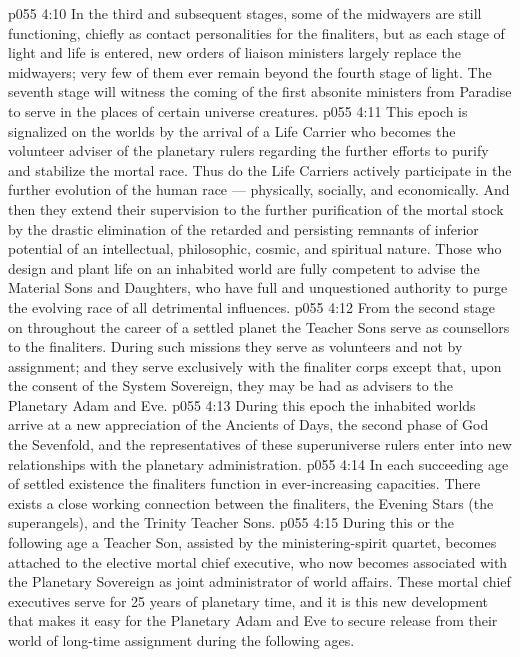 \vs p055 4:10 In the third and subsequent stages, some of the midwayers are still functioning, chiefly as contact personalities for the finaliters, but as each stage of light and life is entered, new orders of liaison ministers largely replace the midwayers; very few of them ever remain beyond the fourth stage of light. The seventh stage will witness the coming of the first absonite ministers from Paradise to serve in the places of certain universe creatures.
\vs p055 4:11 \bibnobreakspace {} This epoch is signalized on the worlds by the arrival of a Life Carrier who becomes the volunteer adviser of the planetary rulers regarding the further efforts to purify and stabilize the mortal race. Thus do the Life Carriers actively participate in the further evolution of the human race --- physically, socially, and economically. And then they extend their supervision to the further purification of the mortal stock by the drastic elimination of the retarded and persisting remnants of inferior potential of an intellectual, philosophic, cosmic, and spiritual nature. Those who design and plant life on an inhabited world are fully competent to advise the Material Sons and Daughters, who have full and unquestioned authority to purge the evolving race of all detrimental influences.
\vs p055 4:12 From the second stage on throughout the career of a settled planet the Teacher Sons serve as counsellors to the finaliters. During such missions they serve as volunteers and not by assignment; and they serve exclusively with the finaliter corps except that, upon the consent of the System Sovereign, they may be had as advisers to the Planetary Adam and Eve.
\vs p055 4:13 \bibnobreakspace {} During this epoch the inhabited worlds arrive at a new appreciation of the Ancients of Days, the second phase of God the Sevenfold, and the representatives of these superuniverse rulers enter into new relationships with the planetary administration.
\vs p055 4:14 In each succeeding age of settled existence the finaliters function in ever\hyp{}increasing capacities. There exists a close working connection between the finaliters, the Evening Stars (the superangels), and the Trinity Teacher Sons.
\vs p055 4:15 During this or the following age a Teacher Son, assisted by the ministering\hyp{}spirit quartet, becomes attached to the elective mortal chief executive, who now becomes associated with the Planetary Sovereign as joint administrator of world affairs. These mortal chief executives serve for 25 years of planetary time, and it is this new development that makes it easy for the Planetary Adam and Eve to secure release from their world of long\hyp{}time assignment during the following ages.
